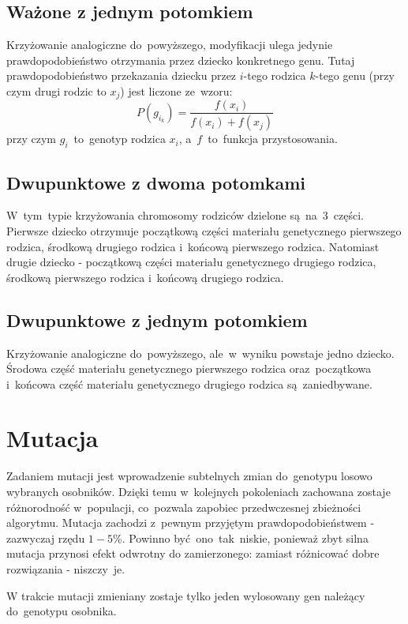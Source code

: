 \documentclass[11pt]{aghdpl}
\begin{document}
\section{Ważone z jednym potomkiem}
\label{sec:wazone}
Krzyżowanie analogiczne do~powyższego, modyfikacji ulega jedynie prawdopodobieństwo otrzymania przez dziecko konkretnego genu. 
Tutaj prawdopodobieństwo przekazania dziecku przez $i$-tego rodzica $k$-tego genu (przy czym drugi rodzic to $x_{j}$) jest liczone ze~wzoru:
$$
P(g_{i_{k}}) = \frac{f(x_{i})}{f(x_{i}) + f(x_{j})}
$$
przy czym $g_{i}$~to~genotyp rodzica $x_{i}$, a~$f$~to~funkcja przystosowania.

\section{Dwupunktowe z dwoma potomkami}
\label{sec:dwaDwa}
W~tym~typie krzyżowania chromosomy rodziców dzielone są~na~3~części. Pierwsze dziecko otrzymuje początkową części materiału 
genetycznego pierwszego rodzica, środkową drugiego rodzica i~końcową pierwszego rodzica. Natomiast drugie dziecko - 
początkową części materiału genetycznego drugiego rodzica, środkową pierwszego rodzica i~końcową drugiego rodzica.

\section{Dwupunktowe z jednym potomkiem}
\label{sec:dwaJeden}
Krzyżowanie analogiczne do~powyższego, ale~w~wyniku powstaje jedno dziecko. Środowa część materiału genetycznego pierwszego 
rodzica oraz~początkowa i~końcowa część materiału genetycznego drugiego rodzica są~zaniedbywane.

\chapter{Mutacja}
\label{cha:mutation}
Zadaniem mutacji jest wprowadzenie subtelnych zmian do~genotypu losowo wybranych osobników. Dzięki temu w~kolejnych pokoleniach 
zachowana zostaje różnorodność w~populacji, co~pozwala zapobiec przedwczesnej zbieżności algorytmu. Mutacja zachodzi z~pewnym przyjętym prawdopodobieństwem 
- zazwyczaj rzędu $1-5$\%. Powinno być~ono~tak~niskie, ponieważ zbyt silna mutacja przynosi 
efekt odwrotny do zamierzonego: zamiast różnicować dobre rozwiązania - niszczy~je.

W trakcie mutacji zmieniany zostaje tylko jeden wylosowany gen należący do~genotypu osobnika.
\end{document}
